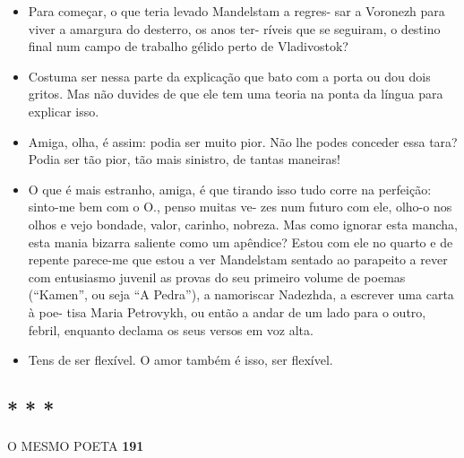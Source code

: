 \begin{itemize}
\tightlist
\item
  Para começar, o que teria levado Mandelstam a regres- sar a Voronezh
  para viver a amargura do desterro, os anos ter- ríveis que se
  seguiram, o destino final num campo de trabalho gélido perto de
  Vladivostok?
\item
  Costuma ser nessa parte da explicação que bato com a porta ou dou dois
  gritos. Mas não duvides de que ele tem uma teoria na ponta da língua
  para explicar isso.
\item
  Amiga, olha, é assim: podia ser muito pior. Não lhe podes conceder
  essa tara? Podia ser tão pior, tão mais sinistro, de tantas maneiras!
\item
  O que é mais estranho, amiga, é que tirando isso tudo corre na
  perfeição: sinto-me bem com o O., penso muitas ve- zes num futuro com
  ele, olho-o nos olhos e vejo bondade, valor, carinho, nobreza. Mas
  como ignorar esta mancha, esta mania bizarra saliente como um
  apêndice? Estou com ele no quarto e de repente parece-me que estou a
  ver Mandelstam sentado ao parapeito a rever com entusiasmo juvenil as
  provas do seu primeiro volume de poemas (``Kamen'', ou seja ``A
  Pedra''), a namoriscar Nadezhda, a escrever uma carta à poe- tisa
  Maria Petrovykh, ou então a andar de um lado para o outro, febril,
  enquanto declama os seus versos em voz alta.
\item
  Tens de ser flexível. O amor também é isso, ser flexível.
\end{itemize}

\subsection{* * *}

O MESMO POETA \textbf{191}

